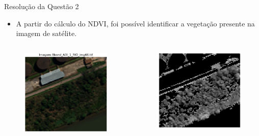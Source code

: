 \documentclass[xcolor=dvipsnames]{beamer}
\begin{document}
	\begin{frame}{Resolução da Questão 2}
		\begin{itemize}
			\item A partir do cálculo do NDVI, foi possível identificar a vegetação presente na imagem de satélite.
		\end{itemize}
		\begin{columns}
			\begin{column}{0.5\linewidth}
				\begin{figure}
					\centering
					\includegraphics[width=0.9\columnwidth]{Figuras/res2-3.png}
				\end{figure}
			\end{column}
			\begin{column}{0.5\linewidth}
				\begin{figure}
					\centering
					\includegraphics[width=0.9\columnwidth]{Figuras/res2-4.png}
				\end{figure}
			\end{column}
		\end{columns}
	\end{frame}
\end{document}
